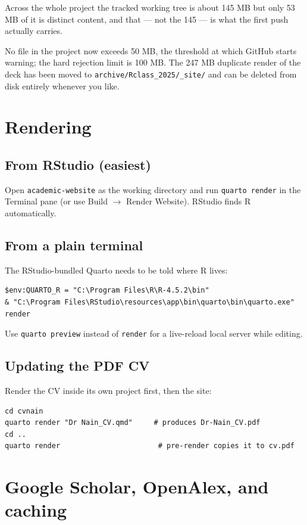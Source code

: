 \documentclass[11pt,a4paper]{article}
\newcommand{\file}[1]{\texttt{#1}}
\begin{document}
Across the whole project the tracked working tree is about 145 MB but only
53 MB of it is distinct content, and that --- not the 145 --- is what the
first push actually carries.

No file in the project now exceeds 50 MB, the threshold at which GitHub
starts warning; the hard rejection limit is 100 MB. The 247 MB duplicate
render of the deck has been moved to \file{archive/Rclass\_2025/\_site/} and
can be deleted from disk entirely whenever you like.

\section{Rendering}\label{sec:render}

\subsection{From RStudio (easiest)}
Open \file{academic-website} as the working directory and run
\texttt{quarto render} in the Terminal pane (or use Build $\to$ Render
Website). RStudio finds R automatically.

\subsection{From a plain terminal}
The RStudio-bundled Quarto needs to be told where R lives:

\begin{lstlisting}
$env:QUARTO_R = "C:\Program Files\R\R-4.5.2\bin"
& "C:\Program Files\RStudio\resources\app\bin\quarto\bin\quarto.exe" render
\end{lstlisting}

Use \texttt{quarto preview} instead of \texttt{render} for a live-reload
local server while editing.

\subsection{Updating the PDF CV}
Render the CV inside its own project first, then the site:

\begin{lstlisting}
cd cvnain
quarto render "Dr Nain_CV.qmd"     # produces Dr-Nain_CV.pdf
cd ..
quarto render                       # pre-render copies it to cv.pdf
\end{lstlisting}

\section{Google Scholar, OpenAlex, and caching}\label{sec:scholar}
\end{document}
